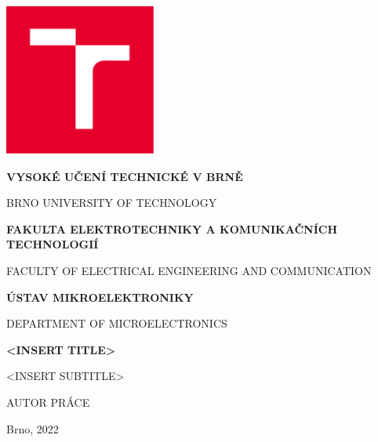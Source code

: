 
\begin{titlepage}

\newcommand{\engsubtitle}[1]{{\color{gray} \large {#1}}}

\raggedright

\parindent0pt
\selectfont  

    
\includegraphics[width=5cm]{pics/VUT_CZ.pdf}
\vspace*{12pt}

\textbf{\huge VYSOKÉ UČENÍ TECHNICKÉ V BRNĚ}

\engsubtitle{BRNO UNIVERSITY OF TECHNOLOGY}
\vspace*{2cm}

\textbf{\Large FAKULTA ELEKTROTECHNIKY A KOMUNIKAČNÍCH TECHNOLOGIÍ}

\engsubtitle{FACULTY OF ELECTRICAL ENGINEERING AND COMMUNICATION}
\vspace*{1cm}

\textbf{\Large ÚSTAV MIKROELEKTRONIKY}

\engsubtitle{DEPARTMENT OF MICROELECTRONICS}

\vfill

\textbf{\Large \MakeUppercase{<insert title>}}

\vspace*{5cm}

\large \MakeUppercase{<insert subtitle>}
\vspace*{18pt}

AUTOR PRÁCE 
\vspace*{18pt}

Brno, 2022


\end{titlepage}